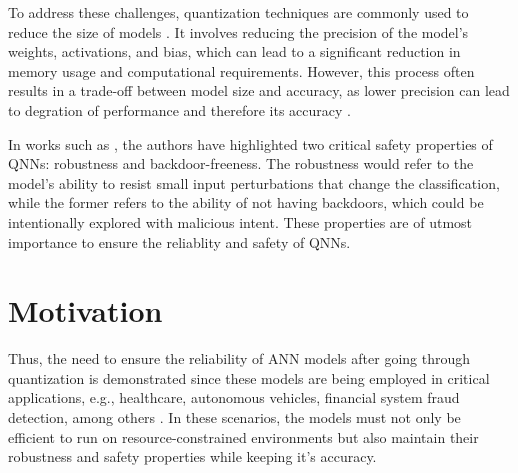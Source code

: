 \begin{comment}
    (JACOB et al., 2017;  LIN; TALATHI; ANNAPUREDDY, 2016)
    (HAN; MAO; DALLY, 2016; NAGEL et al.,  2021)
    (JACOB et al., 2017; HUBARA et  al., 2017)
\end{comment}


To address these challenges, quantization techniques are commonly used to reduce the size of models \cite{Zhu2016Trained, Zhu2020Survey}. It involves reducing the precision of the model's weights, activations, and bias, which can lead to a significant reduction in memory usage and computational requirements. However, this process often results in a trade-off between model size and accuracy, as lower precision can lead to degration of performance and therefore its accuracy \cite{Zhou2017Incremental}.

In works such as \cite{cai2025certified}, the authors have highlighted two critical safety properties of QNNs: robustness and backdoor-freeness. The robustness would refer to the model's ability to resist small input perturbations that change the classification, while the former refers to the ability of not having backdoors, which could be intentionally explored with malicious intent. These properties are of utmost importance to ensure the reliablity and safety of QNNs.


\section{Motivation}



Thus, the need to ensure the reliability of ANN models after going through quantization is demonstrated since these models are being employed in critical applications, e.g., healthcare, autonomous vehicles, financial system fraud detection, among others \cite{OpenAI2023GPT4, Luo2025Efficient, Lei2025An, Zhu2024A}. In these scenarios, the models must not only be efficient to run on resource-constrained environments but also maintain their robustness and safety properties while keeping it's accuracy. 

